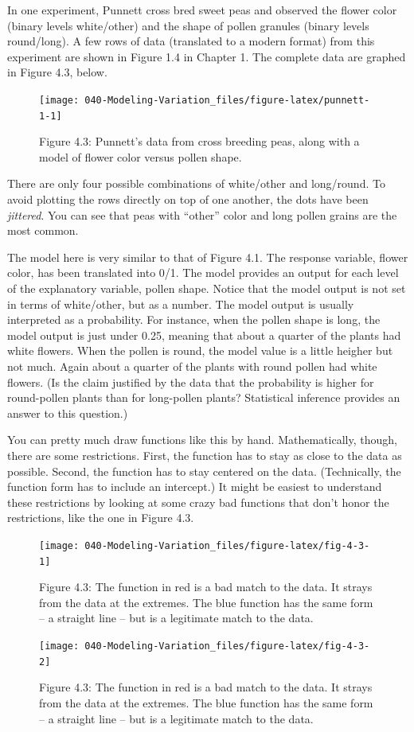 \documentclass[]{tufte-book}
\begin{document}
In one experiment, Punnett cross bred sweet peas and observed the flower color (binary levels white/other) and the shape of pollen granules (binary levels round/long). A few rows of data (translated to a modern format) from this experiment are shown in Figure 1.4 in Chapter 1. The complete data are graphed in Figure 4.3, below.

\begin{figure}\texttt{[image: 040-Modeling-Variation\_files/figure-latex/punnett-1-1]} \caption[Figure 4.3]{Figure 4.3: Punnett's data from cross breeding peas, along with a model of flower color versus pollen shape.}\label{fig:punnett-1}
\end{figure}

There are only four possible combinations of white/other and long/round. To avoid plotting the rows directly on top of one another, the dots have been \emph{jittered}. You can see that peas with ``other'' color and long pollen grains are the most common.

The model here is very similar to that of Figure 4.1. The response variable, flower color, has been translated into 0/1. The model provides an output for each level of the explanatory variable, pollen shape. Notice that the model output is not set in terms of white/other, but as a number. The model output is usually interpreted as a probability. For instance, when the pollen shape is long, the model output is just under 0.25, meaning that about a quarter of the plants had white flowers. When the pollen is round, the model value is a little heigher but not much. Again about a quarter of the plants with round pollen had white flowers. (Is the claim justified by the data that the probability is higher for round-pollen plants than for long-pollen plants? Statistical inference provides an answer to this question.)

You can pretty much draw functions like this by hand. Mathematically, though, there are some restrictions. First, the function has to stay as close to the data as possible. Second, the function has to stay centered on the data. (Technically, the function form has to include an intercept.) It might be easiest to understand these restrictions by looking at some crazy bad functions that don't honor the restrictions, like the one in Figure 4.3.

\begin{figure}\texttt{[image: 040-Modeling-Variation\_files/figure-latex/fig-4-3-1]} \caption[Figure 4.3]{Figure 4.3: The function in red is a bad match to the data. It strays from the data at the extremes. The blue function has the same form -- a straight line -- but is a legitimate match to the data.}\label{fig:fig-4-31}
\end{figure}
\begin{figure}\texttt{[image: 040-Modeling-Variation\_files/figure-latex/fig-4-3-2]} \caption[Figure 4.3]{Figure 4.3: The function in red is a bad match to the data. It strays from the data at the extremes. The blue function has the same form -- a straight line -- but is a legitimate match to the data.}\label{fig:fig-4-32}
\end{figure}
\end{document}
